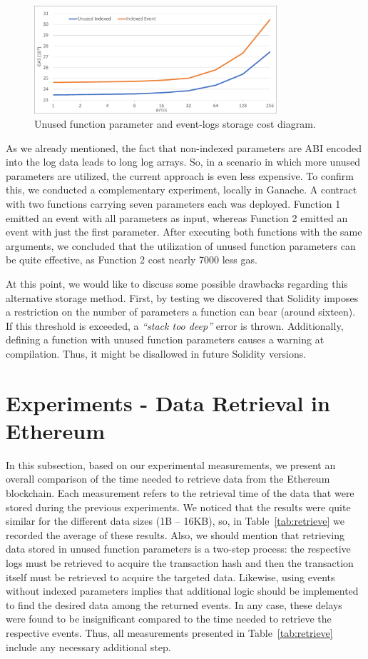 \begin{figure}[htbp]
\centerline{\includegraphics[width=9cm]{figs/unused.pdf}}
\caption{Unused function parameter and event-logs storage cost diagram.}
\label{fig:unused}
\end{figure}

As we already mentioned, the fact that non-indexed parameters are ABI encoded into the log data leads to long log arrays. So, in a scenario in which more unused parameters are utilized, the current approach is even less expensive. To confirm this, we conducted a complementary experiment, locally in Ganache. A contract with two functions carrying seven parameters each was deployed. Function 1 emitted an event with all parameters as input, whereas Function 2 emitted an event with just the first parameter. After executing both functions with the same arguments, we concluded that the utilization of unused function parameters can be quite effective, as Function 2 cost nearly 7000 less gas.

At this point, we would like to discuss some possible drawbacks regarding this alternative storage method. First, by testing we discovered that Solidity imposes a restriction on the number of parameters a function can bear (around sixteen). If this threshold is exceeded, a \emph{``stack too deep''} error is thrown. Additionally, defining a function with unused function parameters causes a warning at compilation. Thus, it might be disallowed in future Solidity versions.

\section{Experiments - Data Retrieval in Ethereum}\label{sec:}
In this subsection, based on our experimental measurements, we present an overall comparison of the time needed to retrieve data from the Ethereum blockchain. Each measurement refers to the retrieval time of the data that were stored during the previous experiments. We noticed that the results were quite similar for the different data sizes (1B – 16KB), so, in Table~\ref{tab:retrieve} we recorded the average of these results. Also, we should mention that retrieving data stored in unused function parameters is a two-step process: the respective logs must be retrieved to acquire the transaction hash and then the transaction itself must be retrieved to acquire the targeted data. Likewise, using events without indexed parameters implies that additional logic should be implemented to find the desired data among the returned events. In any case, these delays were found to be insignificant compared to the time needed to retrieve the respective events. Thus, all measurements presented in Table~\ref{tab:retrieve} include any necessary additional step.

